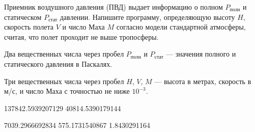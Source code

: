 
Приемник воздушного давления (ПВД) выдает информацию о полном 
$P_{\text{полн}}$ и статическом $P_{\text{стат}}$ давлении. Напишите программу, 
определяющую высоту $H$, скорость полета $V$ и число Маха $M$ согласно модели
стандартной атмосферы, считая, что полет проходит не выше тропосферы.


Два вещественных числа через пробел $P_{\text{полн}}$ и $P_{\text{стат}}$ — значения полного и статического давления в Паскалях.

\outputfmtSection

Три вещественных числа через пробел $H$, $V$, $M$ — высота в метрах, скорость в м/с, и число 
Маха с точностью не ниже $10^{-3}$.

\begin{myverbbox}[\small]{\vinput}
    137842.5939207129 40814.5390179144
\end{myverbbox}
\begin{myverbbox}[\small]{\voutput}
    7039.2966692834 575.1731540867 1.8430291164
\end{myverbbox}

